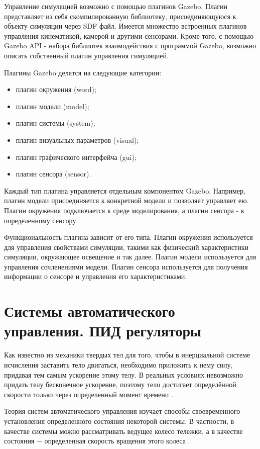 \documentclass[oneside,final,14pt]{extreport}
\begin{document}
Управление симуляцией возможно с помощью плагинов Gazebo. Плагин представляет из себя скомпилированную библиотеку, присоединяющуюся к объекту симуляции через SDF файл. Имеется множество встроенных плагинов управления кинематикой, камерой и другими сенсорами. Кроме того, с помощью Gazebo API - набора библиотек взаимодействия с программой Gazebo, возможно описать собственный плагин управления симуляцией. 

Плагины Gazebo делятся на следующие категории:
\begin{itemize}
\item плагин окружения (word);
\item плагин модели (model);
\item плагин системы (system);
\item плагин визуальных параметров (visual);
\item плагин графического интерфейча (gui);
\item плагин сенсора (sensor).
\end{itemize}

Каждый тип плагина управляется отдельным компонентом Gazebo. Например, плагин модели присоединяется к конкретной модели и позволяет управляет ею. Плагин окружения подключается к среде моделирования, а плагин сенсора - к определенному сенсору. 

Функциональность плагина зависит от его типа. Плагин окружения используется для управления свойствами симуляции, такими как физический характеристики симуляции, окружающее освещение и так далее. Плагин модели используется для управления сочленениями модели. Плагин сенсора используется для получения информации о сенсоре и управления его характеристиками.

\section{Системы автоматического управления. ПИД регуляторы}
Как известно из механики твердых тел для того, чтобы в инерциальной системе исчисления заставить тело двигаться, необходимо приложить к нему силу, придавая тем самым ускорение этому телу. В реальных условиях невозможно придать телу бесконечное ускорение, поэтому тело достигает определённой скорости только через определенный момент времени \cite{Saveliev}. 

Теория систем автоматического управления изучает способы своевременного установления определенного состояния некоторой системы. В частности, в качестве системы можно рассматривать ведущее колесо тележки, а в качестве состояния $-$ определенная скорость вращения этого колеса \cite{pidBook}.
\end{document}
